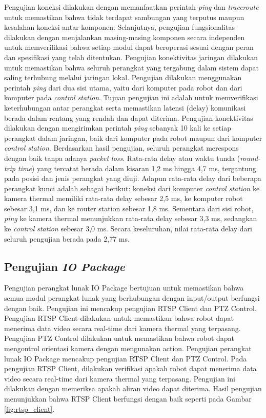 Pengujian koneksi dilakukan dengan memanfaatkan perintah \emph{ping} dan \emph{traceroute}
untuk memastikan bahwa tidak terdapat sambungan yang terputus maupun kesalahan
koneksi antar komponen. Selanjutnya, pengujian fungsionalitas dilakukan dengan
menjalankan masing-masing komponen secara independen untuk memverifikasi bahwa
setiap modul dapat beroperasi sesuai dengan peran dan spesifikasi yang telah
ditentukan. Pengujian konektivitas jaringan dilakukan untuk memastikan bahwa seluruh
perangkat yang tergabung dalam sistem dapat saling terhubung melalui jaringan lokal.
Pengujian dilakukan menggunakan perintah \textit{ping} dari dua sisi utama,
yaitu dari komputer pada robot dan dari komputer pada \textit{control station}.
Tujuan pengujian ini adalah untuk memverifikasi keterhubungan antar perangkat
serta memastikan latensi (delay) komunikasi berada dalam rentang yang rendah dan
dapat diterima. Pengujian konektivitas dilakukan dengan mengirimkan perintah \textit{ping}
sebanyak 10 kali ke setiap perangkat dalam jaringan, baik dari komputer pada robot
maupun dari komputer \textit{control station}. Berdasarkan hasil pengujian,
seluruh perangkat merespons dengan baik tanpa adanya \textit{packet loss}. Rata-rata
delay atau waktu tunda (\textit{round-trip time}) yang tercatat berada dalam kisaran
1{,}2 ms hingga 4{,}7 ms, tergantung pada posisi dan jenis perangkat yang diuji.
Adapun rata-rata delay dari beberapa perangkat kunci adalah sebagai berikut:
koneksi dari komputer \textit{control station} ke kamera thermal memiliki rata-rata
delay sebesar 2{,}5 ms, ke komputer robot sebesar 3{,}1 ms, dan ke router station
sebesar 1{,}8 ms. Sementara dari sisi robot, \textit{ping} ke kamera thermal
menunjukkan rata-rata delay sebesar 3{,}3 ms, sedangkan ke \textit{control
station} sebesar 3{,}0 ms. Secara keseluruhan, nilai rata-rata delay dari
seluruh pengujian berada pada 2{,}77 ms. 

\subsection{Pengujian \emph{IO Package}}
Pengujian perangkat lunak IO Package bertujuan untuk memastikan bahwa semua
modul perangkat lunak yang berhubungan dengan input/output berfungsi dengan baik.
Pengujian ini mencakup pengujian RTSP Client dan PTZ Control. Pengujian RTSP
Client dilakukan untuk memastikan bahwa robot dapat menerima data video secara
real-time dari kamera thermal yang terpasang. Pengujian PTZ Control dilakukan untuk
memastikan bahwa robot dapat mengontrol orientasi kamera dengan mengunakan action.
Pengujian perangkat lunak IO Package mencakup pengujian RTSP Client dan PTZ
Control. Pada pengujian RTSP Client, dilakukan verifikasi apakah robot dapat
menerima data video secara real-time dari kamera thermal yang terpasang. Pengujian
ini dilakukan dengan memeriksa apakah aliran video dapat diterima. Hasil
pengujian menunjukkan bahwa RTSP Client berfungsi dengan baik seperti pada
Gambar \ref{fig:rtsp_client}.

